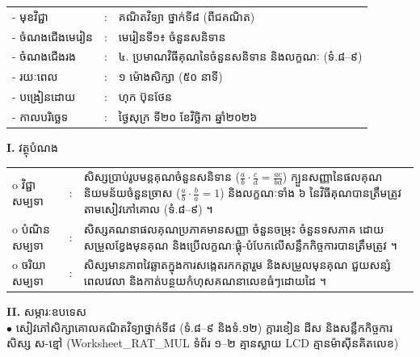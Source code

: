 \documentclass[a4paper,10pt]{article}
\newcommand{\wcirc}{{\CourierBullet\fontsize{9.5pt}{11pt}\selectfont o}}
\newcommand{\en}[1]{{\TimesEn #1}}
\begin{document}
{\renewcommand{\arraystretch}{0.98}
\hspace*{3.1cm}%
\begin{tabular}{@{}l l L{11.0cm}@{}}
  - \hspace{0.35cm} មុខវិជ្ជា & : & គណិតវិទ្យា ថ្នាក់ទី៨ (ពីជគណិត) \\
  - \hspace{0.35cm} ចំណងជើងមេរៀន & : & មេរៀនទី១៖ ចំនួនសនិទាន \\
  - \hspace{0.35cm} ចំណងជើងរង & : & ៤. ប្រមាណវិធីគុណនៃចំនួនសនិទាន និងលក្ខណៈ (ទំ.៨–៩) \\
  - \hspace{0.35cm} រយៈពេល & : & ១ ម៉ោងសិក្សា (៥០ នាទី) \\
  - \hspace{0.35cm} បង្រៀនដោយ & : & ហុក ប៊ុនថែន \\
  - \hspace{0.35cm} កាលបរិច្ឆេទ & : & ថ្ងៃសុក្រ ទី២០ ខែវិច្ឆិកា ឆ្នាំ២០២៦ \\
\end{tabular}

\vspace{2pt}

\textbf{I.} {\muol វត្ថុបំណង}\\[1pt]
\hspace*{0.55cm}%
\begin{tabular}{@{}l l L{14.2cm}@{}}
  \wcirc \hspace{0.25cm} វិជ្ជាសម្បទា & : & សិស្សប្រាប់រូបមន្តគុណចំនួនសនិទាន ($\frac{a}{b}\cdot\frac{c}{d}=\frac{ac}{bd}$) ក្បួនសញ្ញានៃផលគុណ និយមន័យចំនួនច្រាស ($\frac{a}{b}\cdot\frac{b}{a}=1$) និងលក្ខណៈទាំង ៦ នៃវិធីគុណបានត្រឹមត្រូវតាមសៀវភៅគោល (ទំ.៨–៩) ។ \\
  \wcirc \hspace{0.25cm} បំណិនសម្បទា & : & សិស្សគណនាផលគុណប្រភាគមានសញ្ញា ចំនួនចម្រុះ ចំនួនទសភាគ ដោយសម្រួលខ្វែងមុនគុណ និងប្រើលក្ខណៈផ្គុំ-បំបែកលើសន្លឹកកិច្ចការបានត្រឹមត្រូវ ។ \\
  \wcirc \hspace{0.25cm} ចរិយាសម្បទា & : & សិស្សមានភាពវៃឆ្លាតក្នុងការសង្កេតរកកត្តារួម និងសម្រួលមុនគុណ ជួយសន្សំពេលវេលា និងកាត់បន្ថយកំហុសគណនាលេខធំៗដោយដៃ ។ \\
\end{tabular}

\vspace{2pt}

\textbf{II.} {\muol សម្ភារៈឧបទេស}\\[1pt]
\hspace*{0.55cm}$\bullet$ \hspace{0.35cm} សៀវភៅសិក្សាគោលគណិតវិទ្យាថ្នាក់ទី៨ (ទំ.៨–៩ និងទំ.១២) ក្ដារខៀន ដីស និងសន្លឹកកិច្ចការសិស្ស ស-ខ្មៅ (\en{Worksheet\_RAT\_MUL} ទំព័រ ១–២ គ្មានស្លាយ \en{LCD} គ្មានម៉ាស៊ីនគិតលេខ)

}
\end{document}
